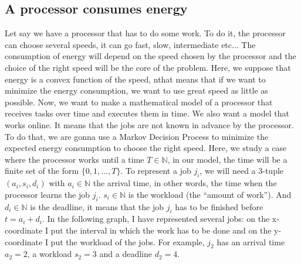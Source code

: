 \documentclass[
10pt, %
a4paper, %
oneside, %
headinclude,footinclude, %
BCOR5mm, %
]{scrartcl}
\newcommand{\N}{\mathbb{N}}
\begin{document}
\subsection{A processor consumes energy}
Let say we have a processor that has to do some work. To do it,
the processor can choose several speeds, it can go fast, slow,
intermediate etc... The consumption of energy will depend on the speed
chosen by the processor and the choice of the right speed will be the
core of the problem.
Here, we suppose that energy is a convex function of
the speed, nthat means that if we want to minimize the energy
consumption, we want to use great speed as little as possible. Now, we
want to make a mathematical model of a processor that receives tasks
over time and executes them in time. We also want a model that works
online. It means that the jobs are not known in advance by the
processor. To do that, we are gonna use a Markov Decision Process to
minimize the expected energy consumption to choose the right
speed. Here, we study a case where the processor works until a time
$T\in\N$, in our model, the time will be a finite set of the form
$\{0,1,\dots,T\}$. To represent a job $j_i$, we will need a 3-tuple
$(a_i,s_i,d_i)$ with $a_i\in\N$ the arrival time, in other words, the
time when the processor learns the job $j_i$. $s_i\in\N$ is the
workload (the ``amount of work''). And $d_i\in\N$ is the deadline, it
means that the job $j_i$ has to be finished before $t=a_i+d_i$. In the
following graph, I have represented several jobs: on the x-coordinate
I put the interval in which the work has to be done and on the
y-coordinate I put the workload of the jobs. For example, $j_2$ has an
arrival time $a_2=2$, a workload $s_2=3$ and a deadline $d_2=4$. 

\begin{center}
\end{center}
\end{document}

